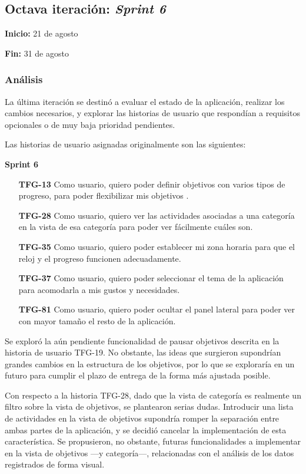 \documentclass[10pt, a4paper]{aqademic}
\begin{document}
\subsection{Octava iteración: \textit{Sprint 6}}

\textbf{Inicio:} 21 de agosto

\textbf{Fin:} 31 de agosto

\subsubsection{Análisis}

La última iteración se destinó a evaluar el estado de la aplicación, realizar los cambios necesarios, y explorar las historias de usuario que respondían a requisitos opcionales o de muy baja prioridad pendientes.

Las historias de usuario asignadas originalmente son las siguientes:

\textbf{Sprint 6}
\begin{itemize}[leftmargin=16mm]
	\item [\textbf{TFG-13}] Como usuario, quiero poder definir objetivos con varios tipos de progreso, para poder flexibilizar mis objetivos .
	
	\item [\textbf{TFG-28}] Como usuario, quiero ver las actividades asociadas a una categoría en la vista de esa categoría para poder ver fácilmente cuáles son.
	
	\item [\textbf{TFG-35}] Como usuario, quiero poder establecer mi zona horaria para que el reloj y el progreso funcionen adecuadamente.
	
	\item [\textbf{TFG-37}] Como usuario, quiero poder seleccionar el tema de la aplicación para acomodarla a mis gustos y necesidades.
	
	\item [\textbf{TFG-81}] Como usuario, quiero poder ocultar el panel lateral para poder ver con mayor tamaño el resto de la aplicación.
\end{itemize}

Se exploró la aún pendiente funcionalidad de pausar objetivos descrita en la historia de usuario TFG-19. No obstante, las ideas que surgieron supondrían grandes cambios en la estructura de los objetivos, por lo que se exploraría en un futuro para cumplir el plazo de entrega de la forma más ajustada posible.

Con respecto a la historia TFG-28, dado que la vista de categoría es realmente un filtro sobre la vista de objetivos, se plantearon serias dudas. Introducir una lista de actividades en la vista de objetivos supondría romper la separación entre ambas partes de la aplicación, y se decidió cancelar la implementación de esta característica. Se propusieron, no obstante, futuras funcionalidades a implementar en la vista de objetivos ---y categoría---, relacionadas con el análisis de los datos registrados de forma visual.
\end{document}
